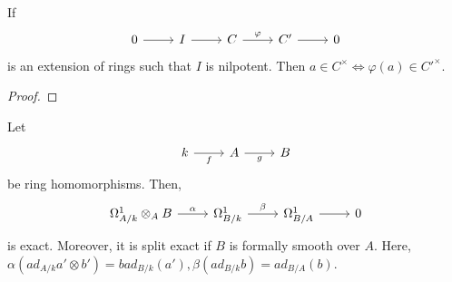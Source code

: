 \documentclass[oneside, 12pt]{scrbook}
\theoremstyle{theorem}
\begin{document}
\begin{lemma}
If \[\begin{tikzcd}
	0 & I & C & C' & 0
	\arrow[from=1-1, to=1-2]
	\arrow[from=1-2, to=1-3]
	\arrow["\varphi", from=1-3, to=1-4]
	\arrow[from=1-4, to=1-5]
\end{tikzcd}\] is an extension of rings such that $I$ is nilpotent. Then $a\in C^{\times} \Leftrightarrow \varphi(a) \in C'^{\times}$.
\end{lemma}

\begin{proof}

\end{proof}

\begin{theorem}
Let \[\begin{tikzcd}
	k & A & B
	\arrow["f"', from=1-1, to=1-2]
	\arrow["g"', from=1-2, to=1-3]
\end{tikzcd}\] be ring homomorphisms. Then, \[\begin{tikzcd}
	{\Omega_{A/k}^{1} \otimes_{A} B } & {\Omega_{B/k}^{1}} & {\Omega_{B/A}^{1}} & 0
	\arrow["\alpha", from=1-1, to=1-2]
	\arrow["\beta", from=1-2, to=1-3]
	\arrow[from=1-3, to=1-4]
\end{tikzcd}\] is exact. Moreover, it is split exact if $B$ is formally smooth over $A$. Here, $\alpha(ad_{A/k}a' \otimes b') = bad_{B/k}(a'), \beta(ad_{B/k}b) = ad_{B/A}(b)$.
\end{theorem}
\end{document}
